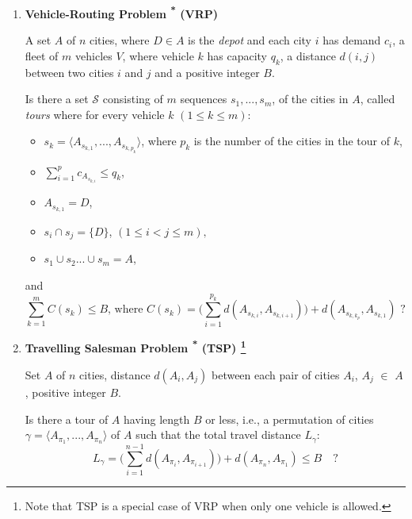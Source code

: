 \documentclass{mprop}
\theoremstyle{definition}
\begin{document}
\begin{enumerate}

\item \textbf{Vehicle-Routing Problem \textsuperscript{*} (VRP)}
\begin{instance}
A set $A$ of $n$ cities, where $D \in A$ is the \textit{depot} and each city $i$ has demand $c_{i}$, a fleet of $m$ vehicles $V$, where vehicle $k$ has capacity $q_{k}$, a distance $d(i,j)$ between two cities $i$ and $j$ and a positive integer $B$.
\end{instance}

\begin{question}
Is there a set $\mathcal{S}$ consisting of $m$ sequences $s_{1},...,s_{m}$, of the cities in $A$, called \textit{tours}
where for every vehicle $k$ $(1 \leq k \leq m)$:
\begin{itemize}
\item $s_{k} = \langle A_{s_{k,1}},...,A_{s_{k,p_{k}}} \rangle$, \quad where $p_{k}$ is the number of the cities in the tour of $k$,
\item $\sum_{i = 1}^{p} c_{A_{s_{k,i}}} \leq q_{k}$,
\item $A_{s_{k,1}} = D$,
\item $s_{i} \cap s_{j} = \{D\}$, \quad $(1 \leq i < j \leq m),$
\item $s_{1} \cup s_{2} ... \cup s_{m} = A$,
\end{itemize}
and
$$ \sum_{k=1}^{m} C(s_{k}) \leq B \textrm{, where } C(s_{k}) = \bigg( \sum_{i=1}^{p_{k}} d(A_{s_{k,i}}, A_{s_{k,i+1}}) \bigg) + d(A_{s_{k,k_{p}}}, A_{s_{k,1}}) \textrm{ ?}$$
\end{question}


\item \textbf{Travelling Salesman Problem \textsuperscript{*} (TSP) \footnote{Note that TSP is a special case of VRP when only one vehicle is allowed.}}
\begin{instance}
Set $A$ of $n$ cities, distance $d(A_{i}, A_{j})$ between each pair of cities $A_{i}$, $A_{j}$ $\in$ $A$, positive integer $B$.
\end{instance}

\begin{question}
Is there a tour of $A$ having length $B$ or less, i.e., a permutation of cities $\gamma = \langle A_{\pi_{1}},...,A_{\pi_{n}} \rangle $ of $A$ such that the total travel distance $L_{\gamma}$:
$$L_{\gamma} = \bigg( \sum_{i=1}^{n-1} d(A_{\pi_{i}}, A_{\pi_{i+1}}) \bigg) + d(A_{\pi_{n}}, A_{\pi_{1}}) \leq B \quad \textrm{?}$$
\end{question}


\end{enumerate}
\end{document}
